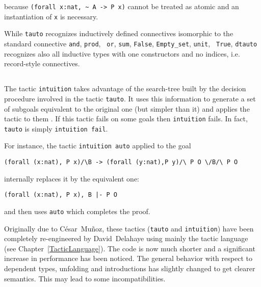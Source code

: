 because \verb=(forall x:nat, ~ A -> P x)= cannot be treated as atomic and an
instantiation of \verb=x= is necessary.

\begin{Variants}

\item {}

  While {\tt tauto} recognizes inductively defined connectives
  isomorphic to the standard connective {\tt and}, {\tt prod}, {\tt
    or}, {\tt sum}, {\tt False}, {\tt Empty\_set}, {\tt unit}, {\tt
    True}, {\tt dtauto} recognizes also all inductive types with
  one constructors and no indices, i.e. record-style connectives.

\end{Variants}

\subsection{}
\label{intuition}

The tactic \texttt{intuition} takes advantage of the search-tree built
by the decision procedure involved in the tactic {\tt tauto}. It uses
this information to generate a set of subgoals equivalent to the
original one (but simpler than it) and applies the tactic
{\tac} to them \cite{Mun94}. If this tactic fails on some goals then
{\tt intuition} fails. In fact, {\tt tauto} is simply {\tt intuition
  fail}.

For instance, the tactic {\tt intuition auto} applied to the goal
\begin{verbatim}
(forall (x:nat), P x)/\B -> (forall (y:nat),P y)/\ P O \/B/\ P O
\end{verbatim}
internally replaces it by the equivalent one:
\begin{verbatim}
(forall (x:nat), P x), B |- P O
\end{verbatim}
and then uses {\tt auto} which completes the proof.

Originally due to C{\'e}sar~Mu{\~n}oz, these tactics ({\tt tauto} and {\tt intuition})
have been completely re-engineered by David~Delahaye using mainly the tactic
language (see Chapter~\ref{TacticLanguage}). The code is now much shorter and
a significant increase in performance has been noticed. The general behavior
with respect to dependent types, unfolding and introductions has
slightly changed to get clearer semantics. This may lead to some
incompatibilities.

